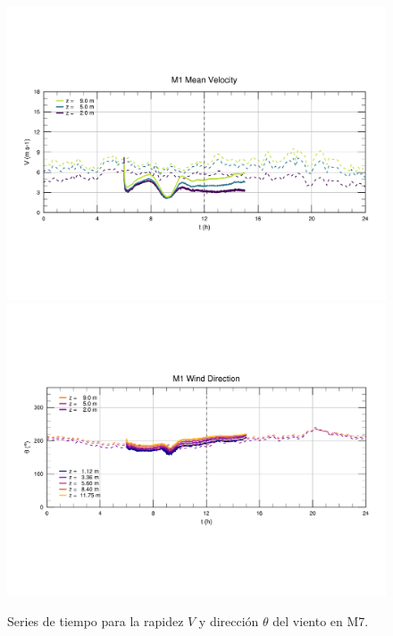 \begin{figure}[H]
	\centering
	\includegraphics[width=0.87\linewidth,page=7,trim={9mm 57mm 10mm 60mm},clip]{Imagenes/06/bol/ts_interpol_compare.pdf}\\%
	\includegraphics[width=0.87\linewidth,page=7,trim={12mm 52mm 10mm 60mm},clip]{Imagenes/06/bol/ts_interpol_compare_o.pdf}%
	\vspace{-2mm}\caption{Series de tiempo para la rapidez $V$ y dirección $\theta$ del viento en M7.}
	\label{fig:06_bol_ts_m7}
\end{figure}

